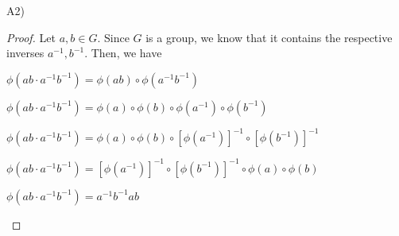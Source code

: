 \documentclass[executivepaper]{article}
\begin{document}
\begin{flushleft}

A2)

\begin{proof}

Let $a, b \in G$. Since $G$ is a group, we know that it contains the respective inverses $a^{-1}, b^{-1}$. Then, we have

\begin{center}

$\phi \left(ab \cdot a^{-1}b^{-1}\right)=\phi \left(ab\right) \circ \phi \left(a^{-1}b^{-1}\right)$

\vspace{2mm}

$\phi \left(ab \cdot a^{-1}b^{-1}\right)=\phi \left(a \right) \circ \phi \left(b \right) \circ \phi \left(a^{-1} \right) \circ \phi \left(b^{-1} \right)$

\vspace{2mm}

$\phi \left(ab \cdot a^{-1}b^{-1}\right)=\phi \left(a \right) \circ \phi \left(b \right) \circ \left[\phi \left(a^{-1} \right)\right]^{-1} \circ \left[\phi \left(b^{-1} \right)\right]^{-1}$

\vspace{2mm}

$\phi \left(ab \cdot a^{-1}b^{-1}\right)=\left[\phi \left(a^{-1} \right)\right]^{-1} \circ \left[\phi \left(b^{-1} \right)\right]^{-1} \circ \phi \left(a \right) \circ \phi \left(b \right)$

\vspace{2mm}

$\phi \left(ab \cdot a^{-1}b^{-1}\right)=a^{-1}b^{-1}ab$

\end{center}

\end{proof}

\end{flushleft}

\vspace{5mm}
\end{document}
